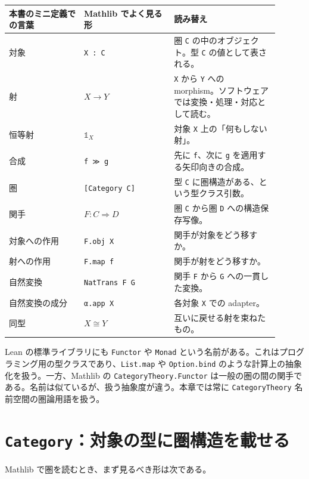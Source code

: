 \begin{longtable}{p{0.25\linewidth}p{0.30\linewidth}p{0.35\linewidth}}
\toprule
本書のミニ定義での言葉 & Mathlib でよく見る形 & 読み替え \\
\midrule
対象 & \texttt{X : C} & 圏 \texttt{C} の中のオブジェクト。型 \texttt{C} の値として表される。 \\
射 & \(X \longrightarrow Y\) & \texttt{X} から \texttt{Y} への morphism。ソフトウェアでは変換・処理・対応として読む。 \\
恒等射 & \(\mathbb{1}_X\) & 対象 \texttt{X} 上の「何もしない射」。 \\
合成 & \texttt{f ≫ g} & 先に \texttt{f}、次に \texttt{g} を適用する矢印向きの合成。 \\
圏 & \texttt{[Category C]} & 型 \texttt{C} に圏構造がある、という型クラス引数。 \\
関手 & \(F : C \Rightarrow D\) & 圏 \texttt{C} から圏 \texttt{D} への構造保存写像。 \\
対象への作用 & \texttt{F.obj X} & 関手が対象をどう移すか。 \\
射への作用 & \texttt{F.map f} & 関手が射をどう移すか。 \\
自然変換 & \texttt{NatTrans F G} & 関手 \texttt{F} から \texttt{G} への一貫した変換。 \\
自然変換の成分 & \texttt{α.app X} & 各対象 \texttt{X} での adapter。 \\
同型 & \(X \cong Y\) & 互いに戻せる射を束ねたもの。 \\
\bottomrule
\end{longtable}

\begin{warningbox}
Lean の標準ライブラリにも \texttt{Functor} や \texttt{Monad} という名前がある。これはプログラミング用の型クラスであり、\texttt{List.map} や \texttt{Option.bind} のような計算上の抽象化を扱う。一方、Mathlib の \texttt{CategoryTheory.Functor} は一般の圏の間の関手である。名前は似ているが、扱う抽象度が違う。本章では常に \texttt{CategoryTheory} 名前空間の圏論用語を扱う。
\end{warningbox}

\section{\texttt{Category}：対象の型に圏構造を載せる}

Mathlib で圏を読むとき、まず見るべき形は次である。

